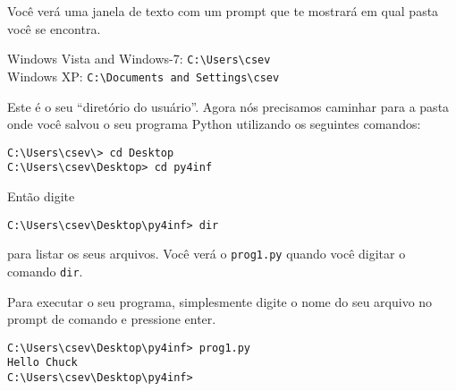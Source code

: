 Você verá uma janela de texto com um prompt que te mostrará
em qual pasta você se encontra.

Windows Vista and Windows-7: {\tt C:{\textbackslash}Users{\textbackslash}csev}\\
Windows XP: {\tt C:{\textbackslash}Documents and Settings{\textbackslash}csev}

Este é o seu ``diretório do usuário''. Agora nós precisamos
caminhar para a pasta onde você salvou o seu programa Python
utilizando os seguintes comandos:
%

\beforeverb
\begin{verbatim}
C:\Users\csev\> cd Desktop
C:\Users\csev\Desktop> cd py4inf
\end{verbatim}
\afterverb

Então digite
%

\beforeverb
\begin{verbatim}
C:\Users\csev\Desktop\py4inf> dir 
\end{verbatim}
\afterverb

para listar os seus arquivos. Você verá o {\tt prog1.py} quando
você digitar o comando {\tt dir}.
%

Para executar o seu programa, simplesmente digite o nome do seu
arquivo no prompt de comando e pressione enter.

\beforeverb
\begin{verbatim}
C:\Users\csev\Desktop\py4inf> prog1.py
Hello Chuck
C:\Users\csev\Desktop\py4inf> 
\end{verbatim}
\afterverb

